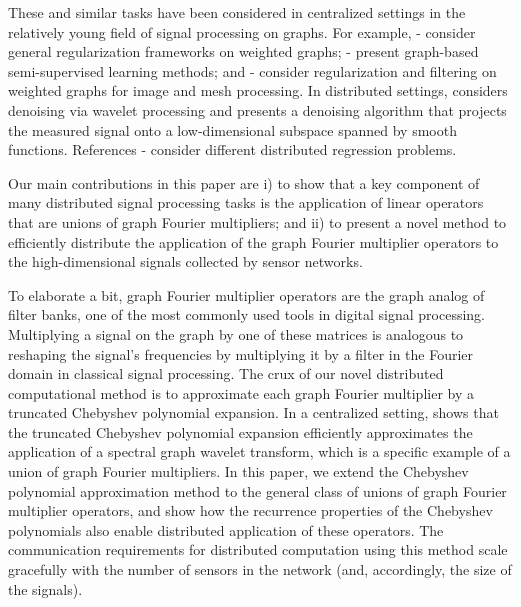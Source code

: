\documentclass[conference]{IEEEtran}
\begin{document}
These and similar tasks have been considered in centralized settings in the relatively young field of signal processing on graphs. For example, \cite{smola}-\nocite{zhou_scholkopf}\cite{reg_discrete} consider general regularization frameworks on weighted graphs; \cite{harmonic}-\nocite{belkin_matveeva}\cite{zhou_bousquet} present graph-based semi-supervised learning methods; and \cite{bougleux}-\nocite{elmoataz, hancock}\cite{peyre_nlr} consider regularization and filtering on weighted graphs for image and mesh processing.
In distributed settings, \cite{wagner} considers denoising via wavelet processing and \cite{barbarossa} presents a denoising algorithm that projects the measured signal onto a low-dimensional subspace spanned by smooth functions.
References \cite{guestrin}-\nocite{predd_tit}\cite{dlasso} consider different distributed regression problems.



Our main contributions in this paper are i) to show that a key component of many distributed signal processing tasks is the application of linear operators that are unions of graph Fourier multipliers; and ii) to present a novel method to efficiently distribute the application of the graph Fourier multiplier operators to the high-dimensional signals collected by sensor networks.

To elaborate a bit, graph Fourier multiplier operators are the graph analog of filter banks, one of the most commonly used tools in digital signal processing. Multiplying a signal on the graph by one of these matrices is analogous to reshaping the signal's frequencies by multiplying it by a filter in the Fourier domain in classical signal processing. The crux of our novel distributed computational method is to approximate each graph Fourier multiplier by a truncated Chebyshev polynomial expansion. In a centralized setting, \cite{LTS-ARTICLE-2009-053} shows that the truncated Chebyshev polynomial expansion efficiently approximates the application of a spectral graph wavelet transform, which is a specific example of a union of graph Fourier multipliers.
In this paper, we extend the Chebyshev polynomial approximation method to the general class of unions of graph Fourier multiplier operators, and show how the recurrence properties of the Chebyshev polynomials also enable distributed application of these operators. The communication requirements for distributed computation using this method scale gracefully with the number of sensors in the network (and, accordingly, the size of the signals).
\end{document}
